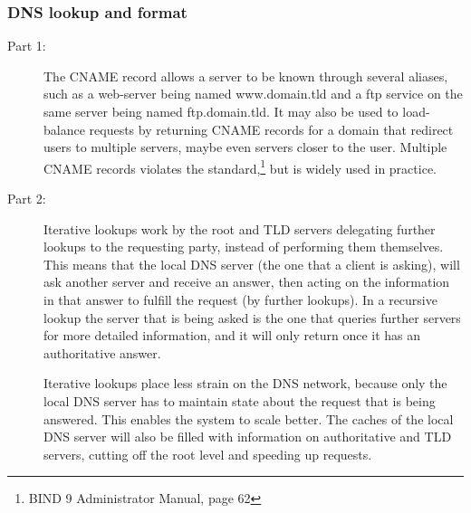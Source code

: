 \subsubsection{DNS lookup and format}
\begin{description}
    \item[Part 1:] The CNAME record allows a server to be known through several
        aliases, such as a web-server being named www.domain.tld and a ftp
        service on the same server being named ftp.domain.tld. It may also be
        used to load-balance requests by returning CNAME records for a domain
        that redirect users to multiple servers, maybe even servers closer to
        the user. Multiple CNAME records violates the standard,\footnote{BIND 9
            Administrator Manual,
        page 62} but is widely used in practice.
    \item[Part 2:] Iterative lookups work by the root and TLD servers
        delegating further lookups to the requesting party, instead of
        performing them themselves.
        This means that the local DNS server (the one that a client is asking),
        will ask another server and receive an answer, then acting on the
        information in that answer to fulfill the request (by further lookups).
        In a recursive lookup the server that is being asked is the one that
        queries further servers for more detailed information, and it will only
        return once it has an authoritative answer.

        Iterative lookups place less strain on the DNS network, because only
        the local DNS server has to maintain state about the request that is
        being answered. This enables the system to scale better. The caches of
        the local DNS server will also be filled with information on
        authoritative and TLD servers, cutting off the root level and speeding up
        requests.


\end{description}
